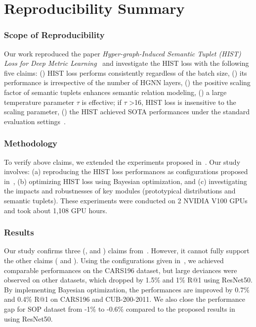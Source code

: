 \newcommand{\RNum}[1]{\lowercase\expandafter{\romannumeral #1\relax}}

\section*{\centering Reproducibility Summary}
\vspace{-1.8mm}
\subsubsection*{Scope of Reproducibility}
Our work reproduced the paper \textit{Hyper-graph-Induced Semantic Tuplet (HIST) Loss for Deep Metric Learning}~\cite{lim2022hypergraph} and investigate the HIST loss with the following five claims: (\RNum{1}) HIST loss performs consistently regardless of the batch size, (\RNum{2}) its performance is irrespective of the number of HGNN layers, (\RNum{3}) the positive scaling factor of semantic tuplets enhances semantic relation modeling, (\RNum{4}) a large temperature parameter $\tau$ is effective; if $\tau$ >16, HIST loss is insensitive to the scaling parameter, (\RNum{5}) the HIST achieved SOTA performances under the standard evaluation settings~\cite{kim2020proxy,oh2016deep}.
\vspace{-1.8mm}
\subsubsection*{Methodology}
To verify above claims, we extended the experiments proposed in~\cite{lim2022hypergraph}. Our study involves: (a) reproducing the HIST loss performances as configurations proposed in~\cite{lim2022hypergraph}, (b) optimizing HIST loss using Bayesian optimization, and (c) investigating the impacts and robustnesses of key modules (prototypical distributions and semantic tuplets). These experiments were conducted on 2 NVIDIA V100 GPUs and took about 1,108 GPU hours.
\vspace{-1.8mm}
\subsubsection*{Results}
Our study confirms three (\RNum{3}, \RNum{4} and \RNum{5}) claims from~\cite{lim2022hypergraph}. However, it cannot fully support the other claims (\RNum{1} and \RNum{2}). Using the configurations given in~\cite{lim2022hypergraph}, we achieved comparable performances on the CARS196 dataset, but large deviances were observed on other datasets, which dropped by 1.5\% and 1\% R@1 using ResNet50. By implementing Bayesian optimization, the performances are improved by 0.7\% and 0.4\% R@1 on CARS196 and CUB-200-2011. We also close the performance gap for SOP dataset from -1\% to -0.6\% compared to the proposed results in~\cite{lim2022hypergraph} using ResNet50.  
\vspace{-1.8mm}
